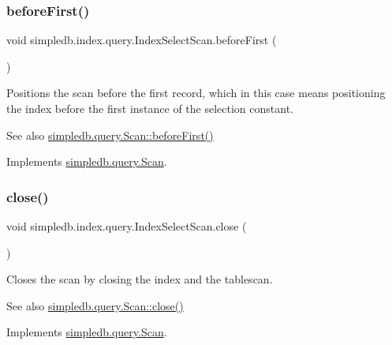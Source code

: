 \subsubsection{\texorpdfstring{before\+First()}{beforeFirst()}}
{\footnotesize\ttfamily void simpledb.\+index.\+query.\+Index\+Select\+Scan.\+before\+First (\begin{DoxyParamCaption}{ }\end{DoxyParamCaption})\hspace{0.3cm}{\ttfamily [inline]}}

Positions the scan before the first record, which in this case means positioning the index before the first instance of the selection constant. \begin{DoxySeeAlso}{See also}
\hyperlink{interfacesimpledb_1_1query_1_1Scan_a2eceb634b69da9bf1269a4355808cc6b}{simpledb.\+query.\+Scan\+::before\+First()} 
\end{DoxySeeAlso}


Implements \hyperlink{interfacesimpledb_1_1query_1_1Scan_a2eceb634b69da9bf1269a4355808cc6b}{simpledb.\+query.\+Scan}.

\mbox{\label{classsimpledb_1_1index_1_1query_1_1IndexSelectScan_a5dab2095d3e3d77a6db1f8ad849dc8ad}} 
\subsubsection{\texorpdfstring{close()}{close()}}
{\footnotesize\ttfamily void simpledb.\+index.\+query.\+Index\+Select\+Scan.\+close (\begin{DoxyParamCaption}{ }\end{DoxyParamCaption})\hspace{0.3cm}{\ttfamily [inline]}}

Closes the scan by closing the index and the tablescan. \begin{DoxySeeAlso}{See also}
\hyperlink{interfacesimpledb_1_1query_1_1Scan_a260f40a8c82edaa00398bea9d698933c}{simpledb.\+query.\+Scan\+::close()} 
\end{DoxySeeAlso}


Implements \hyperlink{interfacesimpledb_1_1query_1_1Scan_a260f40a8c82edaa00398bea9d698933c}{simpledb.\+query.\+Scan}.

